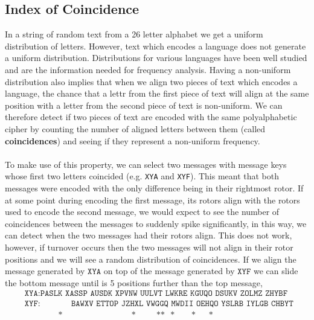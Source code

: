 \subsection{Index of Coincidence}
In a string of random text from a 26 letter alphabet we get a uniform
distribution of letters. However, text which encodes a language does
not generate a uniform distribution. Distributions for various
languages have been well studied and are the information needed for
frequency analysis. Having a non-uniform distribution also implies
that when we align two pieces of text which encodes a language, the chance that a lettr from the first piece of text will align at the same position with a letter
from the second piece of text is non-uniform. We can therefore detect if
two pieces of text are encoded with the same
polyalphabetic cipher by counting the number of aligned letters
between them (called {\bf{coincidences}}) and seeing if they
represent a non-uniform frequency.
\\\\To make use of this property, we can select two messages with
message keys whose first two letters coincided (e.g. \texttt{XYA} and
\texttt{XYF}). This meant that both messages were encoded with the
only difference being in their rightmost rotor. If at some point
during encoding the first message, its rotors align with the rotors
used to encode the second message, we would expect to see the number
of coincidences between the messages to suddenly spike significantly,
in this way, we can detect when the two messages had their rotors
align. This does not work, however, if turnover occurs then the two
messages will not align in their rotor positions and we will see a
random distribution of coincidences. If we align the message
generated by $\texttt{XYA}$ on top of the message generated by
$\texttt{XYF}$ we can slide the bottom message until is 5 positions
further than the top message,
\begin{align*}
	 & \texttt{XYA}: \texttt{PASLK XASSP AUSDK XPVNW UULVT LWKRE KGUQO
		DSUKV ZOLMZ ZHYBF}
	\\
	 & \texttt{XYF}: \texttt{ }\texttt{ }\texttt{ }\texttt{ }\texttt{
	}\texttt{ }\texttt{BAWXV ETTOP JZHXL VWGGQ MWDII OEHQO YSLRB IYLGB
		CHBYT }
	\\
	 &
	\ \ \ \ \ \ \ \ \ \ \ \ \ \ \ \ \ \ \texttt{*}\ \ \ \ \ \ \ \ \ \ \ \ \ \ \ \ \ \ \ \ \ \ \ \ \ \ \ \ \ \ \ \ \ \ \ \ \ \texttt{*}\ \ \ \ \ \ \ \ \ \ \ \texttt{**}\ \ \ \texttt{*}\ \ \ \ \ \ \ \ \ \texttt{*}\ \ \ \ \ \ \ \texttt{*}
\end{align*}
